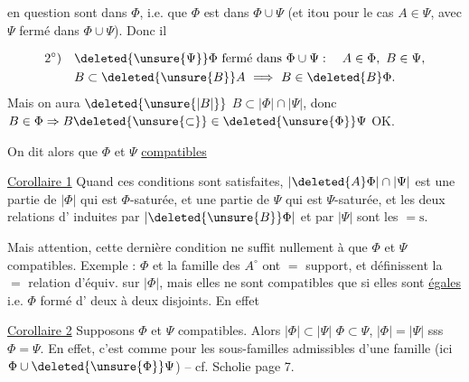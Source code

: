 en question sont dans $\Phi$, i.e. que $\Phi$ est  dans $\Phi\cup\Psi$ (et itou pour le cas $A\in\Psi$, avec $\Psi$ fermé dans $\Phi\cup\Psi$). Donc il 

\[
\begin{aligned}
2^{\circ})\quad &\deleted{\unsure{\Psi}}\Phi\ \text{fermé dans }\Phi\cup\Psi:\quad A\in\Phi,\ B\in\Psi,\\
&B\subset\deleted{\unsure{B}}A\ \Longrightarrow\ B\in\deleted{B}\Phi.
\end{aligned}
\]
Mais on aura $\deleted{\unsure{\lvert B\rvert}}$ $B\subset\lvert\Phi\rvert\cap\lvert\Psi\rvert$, donc $B\in\Phi\Rightarrow B\deleted{\unsure{\subset}}\in\deleted{\unsure{\Phi}}\Psi$ OK.

\uline{} On dit alors que $\Phi$ et $\Psi$ \uline{compatibles}

\uline{Corollaire 1} Quand ces conditions sont satisfaites, $\lvert\deleted{A}\Phi\rvert\cap\lvert\Psi\rvert$ est une partie de $\lvert\Phi\rvert$ qui est $\Phi$-saturée, et une partie de $\Psi$ qui est $\Psi$-saturée, et les deux relations d' induites par $\lvert\deleted{\unsure{B}}\Phi\rvert$ et par $\lvert\Psi\rvert$ sont les $=\mathrm{s}$.

Mais attention, cette dernière condition ne suffit nullement à  que $\Phi$ et $\Psi$ compatibles. Exemple : $\Phi$ et la famille \inserted{$\Phi^{\circ}$} des $A^{\circ}$ ont $=$ support, et définissent la $=$ relation d'équiv. sur $\lvert\Phi\rvert$, mais elles ne sont compatibles que si elles sont \uline{égales}  i.e. $\Phi$ formé d' deux à deux disjoints. En effet 

\uline{Corollaire 2} Supposons $\Phi$ et $\Psi$ compatibles. Alors $\lvert\Phi\rvert\subset\lvert\Psi\rvert$  $\Phi\subset\Psi$, $\lvert\Phi\rvert=\lvert\Psi\rvert$ sss $\Phi=\Psi$.
En effet, c'est comme pour les sous-familles admissibles d'une famille (ici $\Phi\cup\deleted{\unsure{\Phi}}\Psi$) -- cf. Scholie page 7.


